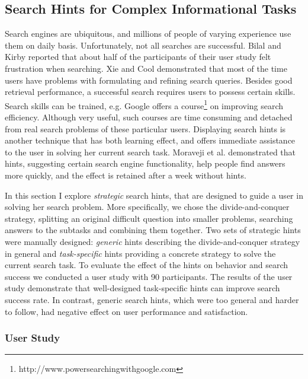 
\subsection{Search Hints for Complex Informational Tasks}
\label{section:users:hints}

Search engines are ubiquitous, and millions of people of varying experience use them on daily basis.
Unfortunately, not all searches are successful.
Bilal and Kirby \cite{Bilal:2002:DSI:637512.637516} reported that about half of the participants of their user study felt frustration when searching.
Xie and Cool \cite{xie2009understanding} demonstrated that most of the time users have problems with formulating and refining search queries.
Besides good retrieval performance, a successful search requires users to possess certain skills.
Search skills can be trained, e.g. Google offers a course\footnote{http://www.powersearchingwithgoogle.com} on improving search efficiency.
Although very useful, such courses are time consuming and detached from real search problems of these particular users.
Displaying search hints is another technique that has both learning effect, and offers immediate assistance to the user in solving her current search task.
Moraveji et al. \cite{Moraveji:2011:MIU:2009916.2009966} demonstrated that hints, suggesting certain search engine functionality, help people find answers more quickly, and the effect is retained after a week without hints.

In this section I explore {\em strategic} search hints, that are designed to guide a user in solving her search problem.
More specifically, we chose the divide-and-conquer strategy, \ie splitting an original difficult question into smaller problems, searching answers to the subtasks and combining them together.
Two sets of strategic hints were manually designed: {\em generic} hints describing the divide-and-conquer strategy in general and {\em task-specific} hints providing a concrete strategy to solve the current search task.
To evaluate the effect of the hints on behavior and search success we conducted a user study with 90 participants.
The results of the user study demonstrate that well-designed task-specific hints can improve search success rate.
In contrast, generic search hints, which were too general and harder to follow, had negative effect on user performance and satisfaction.

\subsubsection{User Study}
\label{section:users:hints:userstudy}


